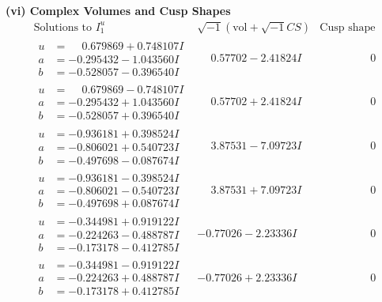\documentclass[1p]{elsarticle_modified}
\theoremstyle{definition}
\newcommand{\I}{\sqrt{-1}}
\begin{document}
\newpage\flushleft \textbf{(vi) Complex Volumes and Cusp Shapes}
$$\begin{array}{c|c|c}  
\text{Solutions to }I^u_{1}& \I (\text{vol} + \sqrt{-1}CS) & \text{Cusp shape}\\
 \hline 
\begin{aligned}
u &= \phantom{-}0.679869 + 0.748107 I \\
a &= -0.295432 - 1.043560 I \\
b &= -0.528057 - 0.396540 I\end{aligned}
 & \phantom{-}0.57702 - 2.41824 I & \phantom{-0.000000 } 0 \\ \hline\begin{aligned}
u &= \phantom{-}0.679869 - 0.748107 I \\
a &= -0.295432 + 1.043560 I \\
b &= -0.528057 + 0.396540 I\end{aligned}
 & \phantom{-}0.57702 + 2.41824 I & \phantom{-0.000000 } 0 \\ \hline\begin{aligned}
u &= -0.936181 + 0.398524 I \\
a &= -0.806021 + 0.540723 I \\
b &= -0.497698 - 0.087674 I\end{aligned}
 & \phantom{-}3.87531 - 7.09723 I & \phantom{-0.000000 } 0 \\ \hline\begin{aligned}
u &= -0.936181 - 0.398524 I \\
a &= -0.806021 - 0.540723 I \\
b &= -0.497698 + 0.087674 I\end{aligned}
 & \phantom{-}3.87531 + 7.09723 I & \phantom{-0.000000 } 0 \\ \hline\begin{aligned}
u &= -0.344981 + 0.919122 I \\
a &= -0.224263 - 0.488787 I \\
b &= -0.173178 - 0.412785 I\end{aligned}
 & -0.77026 - 2.23336 I & \phantom{-0.000000 } 0 \\ \hline\begin{aligned}
u &= -0.344981 - 0.919122 I \\
a &= -0.224263 + 0.488787 I \\
b &= -0.173178 + 0.412785 I\end{aligned}
 & -0.77026 + 2.23336 I & \phantom{-0.000000 } 0 \\ \hline\begin{aligned}

\end{aligned}
\end{array}$$
\end{document}
